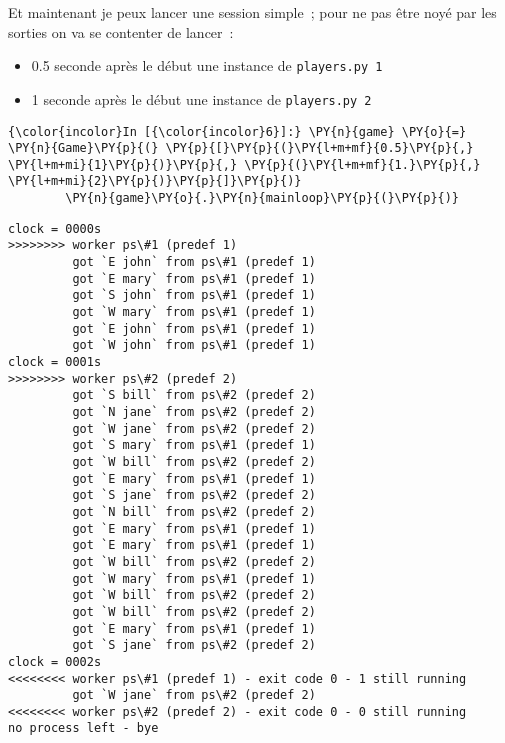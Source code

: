     Et maintenant je peux lancer une session simple~; pour ne pas être noyé
par les sorties on va se contenter de lancer~:

\begin{itemize}
\tightlist
\item
  0.5 seconde après le début une instance de \texttt{players.py\ 1}
\item
  1 seconde après le début une instance de \texttt{players.py\ 2}
\end{itemize}

    \begin{Verbatim}[commandchars=\\\{\}]
{\color{incolor}In [{\color{incolor}6}]:} \PY{n}{game} \PY{o}{=} \PY{n}{Game}\PY{p}{(} \PY{p}{[}\PY{p}{(}\PY{l+m+mf}{0.5}\PY{p}{,} \PY{l+m+mi}{1}\PY{p}{)}\PY{p}{,} \PY{p}{(}\PY{l+m+mf}{1.}\PY{p}{,} \PY{l+m+mi}{2}\PY{p}{)}\PY{p}{]}\PY{p}{)}
        \PY{n}{game}\PY{o}{.}\PY{n}{mainloop}\PY{p}{(}\PY{p}{)}
\end{Verbatim}


    \begin{Verbatim}[commandchars=\\\{\}]
clock = 0000s
>>>>>>>> worker ps\#1 (predef 1)
         got `E john` from ps\#1 (predef 1)
         got `E mary` from ps\#1 (predef 1)
         got `S john` from ps\#1 (predef 1)
         got `W mary` from ps\#1 (predef 1)
         got `E john` from ps\#1 (predef 1)
         got `W john` from ps\#1 (predef 1)
clock = 0001s
>>>>>>>> worker ps\#2 (predef 2)
         got `S bill` from ps\#2 (predef 2)
         got `N jane` from ps\#2 (predef 2)
         got `W jane` from ps\#2 (predef 2)
         got `S mary` from ps\#1 (predef 1)
         got `W bill` from ps\#2 (predef 2)
         got `E mary` from ps\#1 (predef 1)
         got `S jane` from ps\#2 (predef 2)
         got `N bill` from ps\#2 (predef 2)
         got `E mary` from ps\#1 (predef 1)
         got `E mary` from ps\#1 (predef 1)
         got `W bill` from ps\#2 (predef 2)
         got `W mary` from ps\#1 (predef 1)
         got `W bill` from ps\#2 (predef 2)
         got `W bill` from ps\#2 (predef 2)
         got `E mary` from ps\#1 (predef 1)
         got `S jane` from ps\#2 (predef 2)
clock = 0002s
<<<<<<<< worker ps\#1 (predef 1) - exit code 0 - 1 still running
         got `W jane` from ps\#2 (predef 2)
<<<<<<<< worker ps\#2 (predef 2) - exit code 0 - 0 still running
no process left - bye

    \end{Verbatim}

